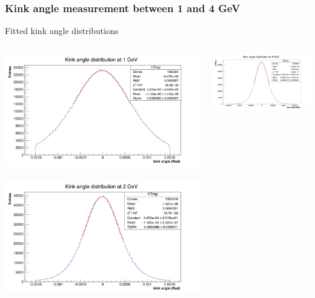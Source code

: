 \documentclass{beamer}
\begin{document}
  \begin{frame}[plain]
    \frametitle{Kink angle measurement between 1 and 4 GeV}

    \begin{block}{Fitted kink angle distributions}
      \begin{columns}[c]
        \begin{column}{5cm}
          \centering
          \includegraphics[width = \textwidth]{Pictures/kinkAngle1GeV.png}
          \
          \includegraphics[width = \textwidth]{Pictures/kinkAngle2GeV.png} 
        \end{column} 
        \begin{column}{5cm}
          \centering
          \includegraphics[width = \textwidth]{Pictures/kinkAngle3GeV.png}

\end{column}
\end{columns}
\end{block}
\end{frame}
\end{document}
